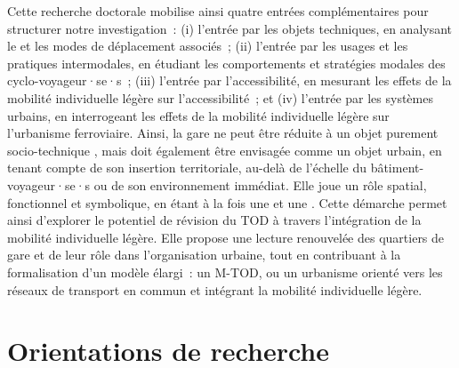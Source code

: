 \begin{refsegment}
Cette recherche doctorale mobilise ainsi quatre entrées complémentaires pour structurer notre investigation~: (i) l’entrée par les objets techniques, en analysant le  et les modes de déplacement associés~; (ii) l’entrée par les usages et les pratiques intermodales, en étudiant les comportements et stratégies modales des cyclo-voyageur·se·s~; (iii) l’entrée par l’\gls{accessibilité}, en mesurant les effets de la mobilité individuelle légère sur l'accessibilité~; et (iv) l’entrée par les systèmes urbains, en interrogeant les effets de la mobilité individuelle légère sur l'urbanisme ferroviaire. Ainsi, la gare ne peut être réduite à un objet purement socio-technique \textcolor{blue}{\autocite[]{joseph_villes_1999}}, mais doit également être envisagée comme un objet urbain, en tenant compte de son insertion territoriale, au-delà de l’échelle du bâtiment-voyageur·se·s ou de son environnement immédiat. Elle joue un rôle spatial, fonctionnel et symbolique, en étant à la fois une  et une  \textcolor{blue}{\autocite[5]{baron_gares_2016}}. Cette démarche permet ainsi d’explorer le potentiel de révision du \acrshort{TOD} à travers l’intégration de la mobilité individuelle légère. Elle propose une lecture renouvelée des quartiers de gare et de leur rôle dans l’organisation urbaine, tout en contribuant à la formalisation d’un modèle élargi~: un \acrfull{M-TOD}, ou un urbanisme orienté vers les réseaux de transport en commun et intégrant la mobilité individuelle légère.%

\section*{Orientations de recherche
    \label{introduction-generale:problematique-objectifs-hypotheses}
    }


\end{refsegment}
